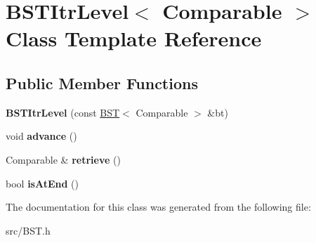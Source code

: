 \hypertarget{class_b_s_t_itr_level}{}\section{B\+S\+T\+Itr\+Level$<$ Comparable $>$ Class Template Reference}
\label{class_b_s_t_itr_level}
\subsection*{Public Member Functions}
\begin{DoxyCompactItemize}
\item 
\hypertarget{class_b_s_t_itr_level_a8fd5cdde93eb182c4cd5cf6b2c5efaeb}{}{\bfseries B\+S\+T\+Itr\+Level} (const \hyperlink{class_b_s_t}{B\+S\+T}$<$ Comparable $>$ \&bt)\label{class_b_s_t_itr_level_a8fd5cdde93eb182c4cd5cf6b2c5efaeb}

\item 
\hypertarget{class_b_s_t_itr_level_ad54a6fa289a59d6050b507abe40d463b}{}void {\bfseries advance} ()\label{class_b_s_t_itr_level_ad54a6fa289a59d6050b507abe40d463b}

\item 
\hypertarget{class_b_s_t_itr_level_a0340bd9f21f72ae25348f383e67e7f91}{}Comparable \& {\bfseries retrieve} ()\label{class_b_s_t_itr_level_a0340bd9f21f72ae25348f383e67e7f91}

\item 
\hypertarget{class_b_s_t_itr_level_a89bc8e81dde255fd6bad917cacc0d489}{}bool {\bfseries is\+At\+End} ()\label{class_b_s_t_itr_level_a89bc8e81dde255fd6bad917cacc0d489}

\end{DoxyCompactItemize}


The documentation for this class was generated from the following file\+:\begin{DoxyCompactItemize}
\item 
src/B\+S\+T.\+h\end{DoxyCompactItemize}
